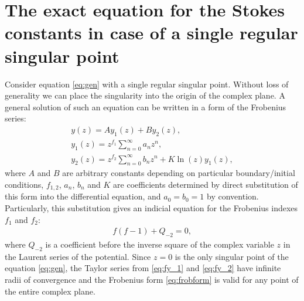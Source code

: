 \documentclass[aip,jmp,reprint]{revtex4-1}
\begin{document}
\section{The exact equation for the Stokes constants in case of a single regular singular point \label{sec:frob}}
Consider equation \eqref{eq:gen} with a single regular singular point. Without loss of generality
we can place the singularity into the origin of the complex plane. A general solution of such an equation 
can be written in a form of the Frobenius series\cite{cbbook}:
\begin{subequations}
\label{eq:frobform}
\begin{eqnarray}
y(z) = A y_1(z)+B y_2(z), \label{eq:fgensol}
\\
y_1(z) = z^{f_1}\sum_{n=0}^{\infty}{a_n z^n}, \label{eq:fy_1}
\\
y_2(z) = z^{f_2}\sum_{n=0}^{\infty}{b_n z^n} + K \ln(z) y_1(z), \label{eq:fy_2}
\end{eqnarray}
\end{subequations}
where $A$ and $B$ are arbitrary constants depending on particular boundary/initial conditions,  
$f_{1,2}$, $a_n$, $b_n$ and $K$ are coefficients determined by direct substitution of this form into the 
differential equation, and $a_0=b_0=1$ by convention. Particularly, this substitution gives
an indicial equation for the Frobenius indexes $f_1$ and $f_2$:
\begin{eqnarray}
f(f-1)+Q_{-2}=0,   \label{eq:indicial}
\end{eqnarray}
where $Q_{-2}$ is a coefficient before the inverse square of the complex variable $z$ in the Laurent series
of the potential. Since $z=0$ is the only singular point of the equation \eqref{eq:gen}, the Taylor 
series from \eqref{eq:fy_1} and \eqref{eq:fy_2} have infinite radii of convergence and the
Frobenius form \eqref{eq:frobform} is valid for any point of the entire complex plane.
\end{document}
